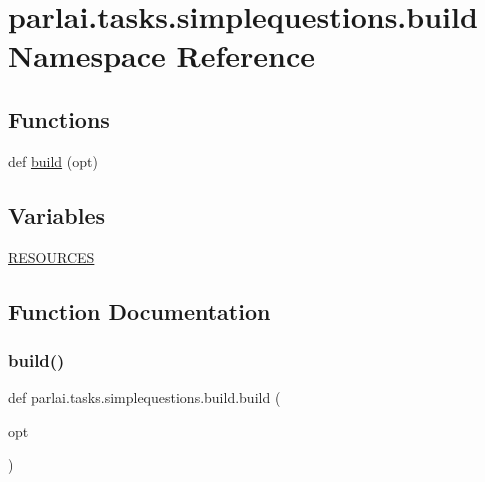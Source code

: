 \hypertarget{namespaceparlai_1_1tasks_1_1simplequestions_1_1build}{}\section{parlai.\+tasks.\+simplequestions.\+build Namespace Reference}
\label{namespaceparlai_1_1tasks_1_1simplequestions_1_1build}
\subsection*{Functions}
\begin{DoxyCompactItemize}
\item 
def \hyperlink{namespaceparlai_1_1tasks_1_1simplequestions_1_1build_adbe26bd28066100d5e756c1b34f8a9b9}{build} (opt)
\end{DoxyCompactItemize}
\subsection*{Variables}
\begin{DoxyCompactItemize}
\item 
\hyperlink{namespaceparlai_1_1tasks_1_1simplequestions_1_1build_a571d66973416f3bda303b6d425b4825c}{R\+E\+S\+O\+U\+R\+C\+ES}
\end{DoxyCompactItemize}


\subsection{Function Documentation}
\mbox{\label{namespaceparlai_1_1tasks_1_1simplequestions_1_1build_adbe26bd28066100d5e756c1b34f8a9b9}} 
\subsubsection{\texorpdfstring{build()}{build()}}
{\footnotesize\ttfamily def parlai.\+tasks.\+simplequestions.\+build.\+build (\begin{DoxyParamCaption}\item[{}]{opt }\end{DoxyParamCaption})}



